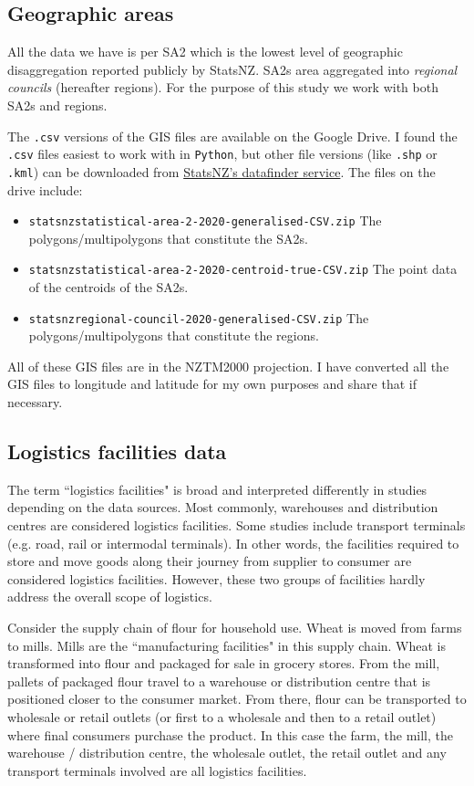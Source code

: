 \documentclass[3p, a4paper, authoryear, 11pt, fleqn, review]{elsarticle}
\begin{document}
\subsection{Geographic areas}
All the data we have is per \ac{SA2} which is the lowest level of geographic disaggregation reported publicly by StatsNZ. \acp{SA2} area aggregated into \emph{regional councils} (hereafter regions). For the purpose of this study we work with both \acp{SA2} and regions. 

The \texttt{.csv} versions of the GIS files are available on the Google Drive. I found the \texttt{.csv} files easiest to work with in \texttt{Python}, but other file versions (like \texttt{.shp} or \texttt{.kml}) can be downloaded from \href{https://datafinder.stats.govt.nz/}{StatsNZ's datafinder service}. The files on the drive include:
\begin{itemize}
\item \texttt{statsnzstatistical-area-2-2020-generalised-CSV.zip} The polygons/multipolygons that constitute the \acp{SA2}. 
\item \texttt{statsnzstatistical-area-2-2020-centroid-true-CSV.zip} The point data of the centroids of the \acp{SA2}. 
\item \texttt{statsnzregional-council-2020-generalised-CSV.zip} The polygons/multipolygons that constitute the regions. 
\end{itemize}

All of these GIS files are in the \ac{NZTM2000} projection. I have converted all the GIS files to longitude and latitude for my own purposes and share that if necessary. 

\subsection{Logistics facilities data}
\label{sec:LogDat}
The term ``logistics facilities" is broad and interpreted differently in studies depending on the data sources. Most commonly, warehouses and distribution centres are considered logistics facilities. Some studies include transport terminals (e.g. road, rail or intermodal terminals). In other words, the facilities required to store and move goods along their journey from supplier to consumer are considered logistics facilities. However, these two groups of facilities hardly address the overall scope of logistics. 

Consider the supply chain of flour for household use. Wheat is moved from farms to mills. Mills are the ``manufacturing facilities" in this supply chain. Wheat is transformed into flour and packaged for sale in grocery stores. From the mill, pallets of packaged flour travel to a warehouse or distribution centre that is positioned closer to the consumer market. From there, flour can be transported to wholesale or retail outlets (or first to a wholesale and then to a retail outlet) where final consumers purchase the product. In this case the farm, the mill, the warehouse / distribution centre, the wholesale outlet, the retail outlet and any transport terminals involved are all logistics facilities. 
\end{document}
